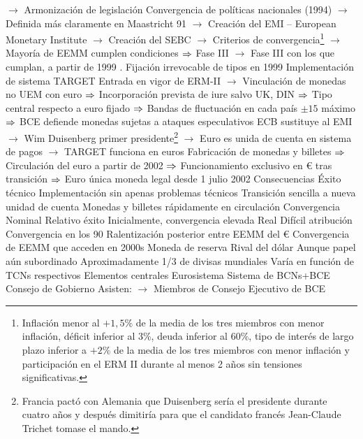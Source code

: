 \documentclass{nuevotema}
\begin{document}
\begin{esquemal}
				\4[] $\to$ Armonización de legislación
				\4[II.] Convergencia de políticas nacionales (1994)
				\4[] $\to$ Definida más claramente en Maastricht 91
				\4[] $\to$ Creación del EMI -- European Monetary Institute
				\4[] $\to$ Creación del SEBC
				\4[] $\to$ Criterios de convergencia\footnote{Inflación menor al $+1,5\%$ de la media de los tres miembros con menor inflación, déficit inferior al 3\%, deuda inferior al $60\%$, tipo de interés de largo plazo inferior a $+2\%$ de la media de los tres miembros con menor inflación y participación en el ERM II durante al menos 2 años sin tensiones significativas.}
				\4[] $\to$ Mayoría de EEMM cumplen condiciones $\Rightarrow$ Fase III
				\4[] $\to$ Fase III con los que cumplan, a partir de 1999
				\4[III]. Fijación irrevocable de tipos en 1999
				\4[] Implementación de sistema TARGET
				\4[] Entrada en vigor de ERM-II
				\4[] $\to$ Vinculación de monedas no UEM con euro
				\4[] $\Rightarrow$ Incorporación prevista de iure salvo UK, DIN
				\4[] $\Rightarrow$ Tipo central respecto a euro fijado
				\4[] $\Rightarrow$ Bandas de fluctuación en cada país $\pm 15$ máximo
				\4[] $\Rightarrow$ BCE defiende monedas sujetas a ataques especulativos
				\4[] ECB sustituye al EMI
				\4[] $\to$ Wim Duisenberg primer presidente\footnote{Francia pactó con Alemania que Duisenberg sería el presidente durante cuatro años y después dimitiría para que el candidato francés Jean-Claude Trichet tomase el mando.}
				\4[] $\to$ Euro es unida de cuenta en sistema de pagos
				\4[] $\to$ TARGET funciona en euros
				\4[] Fabricación de monedas y billetes
				\4[] $\Rightarrow$ Circulación del euro a partir de 2002
				\4[] $\Rightarrow$ Funcionamiento exclusivo en € tras transición
				\4[] $\Rightarrow$ Euro única moneda legal desde 1 julio 2002
		\2 Consecuencias
			\3 Éxito técnico
				\4 Implementación sin apenas problemas técnicos
				\4 Transición sencilla a nueva unidad de cuenta
				\4 Monedas y billetes rápidamente en circulación
			\3 Convergencia
				\4 Nominal
				\4[] Relativo éxito
				\4[] Inicialmente, convergencia elevada
				\4 Real
				\4[] Difícil atribución
				\4[] Convergencia en los 90
				\4[] Ralentización posterior entre EEMM del €
				\4[] Convergencia de EEMM que acceden en 2000s
			\3 Moneda de reserva
				\4 Rival del dólar
				\4[] Aunque papel aún subordinado
				\4 Aproximadamente 1/3 de divisas mundiales
				\4[] Varía en función de TCNs respectivos
	\1 
		\2 Elementos centrales
			\3 Eurosistema
				\4 Sistema de BCNs+BCE
				\4 Consejo de Gobierno
				\4[] Asisten:
				\4[] $\to$ Miembros de Consejo Ejecutivo de BCE

\end{esquemal}
\end{document}
